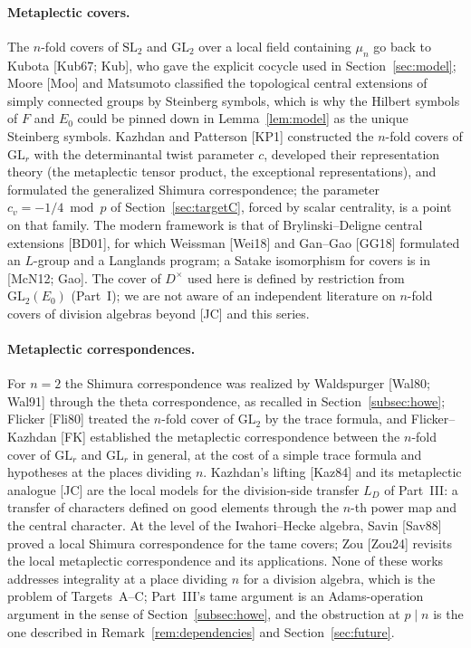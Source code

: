 \documentclass[11pt]{article}
\theoremstyle{plain}
\theoremstyle{definition}
\begin{document}
\paragraph{Metaplectic covers.}  The $n$-fold covers of $\mathrm{SL}_2$
and $\mathrm{GL}_2$ over a local field containing $\mu_n$ go back to
Kubota [Kub67; Kub], who gave the explicit cocycle used in
Section~\ref{sec:model}; Moore [Moo] and Matsumoto classified the
topological central extensions of simply connected groups by Steinberg
symbols, which is why the Hilbert symbols of $F$ and $E_0$ could be
pinned down in Lemma~\ref{lem:model} as the unique Steinberg symbols.
Kazhdan and Patterson [KP1] constructed the $n$-fold covers of
$\mathrm{GL}_r$ with the determinantal twist parameter $c$, developed
their representation theory (the metaplectic tensor product, the
exceptional representations), and formulated the generalized Shimura
correspondence; the parameter $c_v=-1/4\bmod p$ of
Section~\ref{sec:targetC}, forced by scalar centrality, is a point on
that family.  The modern framework is that of Brylinski--Deligne
central extensions [BD01], for which Weissman [Wei18] and Gan--Gao
[GG18] formulated an $L$-group and a Langlands program; a Satake
isomorphism for covers is in [McN12; Gao].  The cover of $D^\times$ used
here is defined by restriction from $\mathrm{GL}_2(E_0)$ (Part~I); we are
not aware of an independent literature on $n$-fold covers of division
algebras beyond [JC] and this series.

\paragraph{Metaplectic correspondences.}  For $n=2$ the Shimura
correspondence was realized by Waldspurger [Wal80; Wal91] through the
theta correspondence, as recalled in Section~\ref{subsec:howe}; Flicker
[Fli80] treated the $n$-fold cover of $\mathrm{GL}_2$ by the trace
formula, and Flicker--Kazhdan [FK] established the metaplectic
correspondence between the $n$-fold cover of $\mathrm{GL}_r$ and
$\mathrm{GL}_r$ in general, at the cost of a simple trace formula and
hypotheses at the places dividing $n$.  Kazhdan's lifting [Kaz84] and
its metaplectic analogue [JC] are the local models for the division-side
transfer $L_D$ of Part~III: a transfer of characters defined on good
elements through the $n$-th power map and the central character.  At
the level of the Iwahori--Hecke algebra, Savin [Sav88] proved a local
Shimura correspondence for the tame covers; Zou [Zou24] revisits the
local metaplectic correspondence and its applications.  None of these
works addresses integrality at a place dividing $n$ for a division
algebra, which is the problem of Targets~A--C; Part~III's tame argument
is an Adams-operation argument in the sense of Section~\ref{subsec:howe},
and the obstruction at $p\mid n$ is the one described in
Remark~\ref{rem:dependencies} and Section~\ref{sec:future}.
\end{document}
